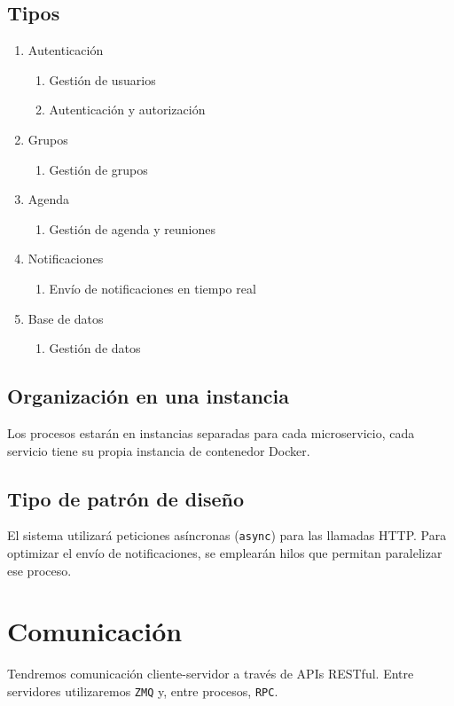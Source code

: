 \documentclass[11pt,a4paper]{article}
\begin{document}
\subsection{Tipos}
\begin{enumerate}
    \item Autenticaci\'on
    \begin{enumerate}
        \item Gesti\'on de usuarios
        \item Autenticaci\'on y autorizaci\'on
    \end{enumerate}
    \item Grupos
    \begin{enumerate}
        \item Gesti\'on de grupos
    \end{enumerate}
    \item Agenda
    \begin{enumerate}
        \item Gesti\'on de agenda y reuniones
    \end{enumerate}
    \item Notificaciones
    \begin{enumerate}
        \item Envío de notificaciones en tiempo real
    \end{enumerate}
    \item Base de datos
    \begin{enumerate}
        \item Gesti\'on de datos
    \end{enumerate}
\end{enumerate}

\subsection{Organizaci\'on en una instancia}
Los procesos estar\'an en instancias separadas para cada microservicio, cada servicio tiene su propia instancia de contenedor Docker.

\subsection{Tipo de patr\'on de dise\~no}
El sistema utilizar\'a peticiones as\'incronas (\texttt{async}) para las llamadas HTTP. Para optimizar el envío de notificaciones, se emplear\'an hilos que permitan paralelizar ese proceso.

\section{Comunicaci\'on}
Tendremos comunicaci\'on cliente-servidor a trav\'es de APIs RESTful. Entre servidores utilizaremos \texttt{ZMQ} y, entre procesos, \texttt{RPC}.
\end{document}
